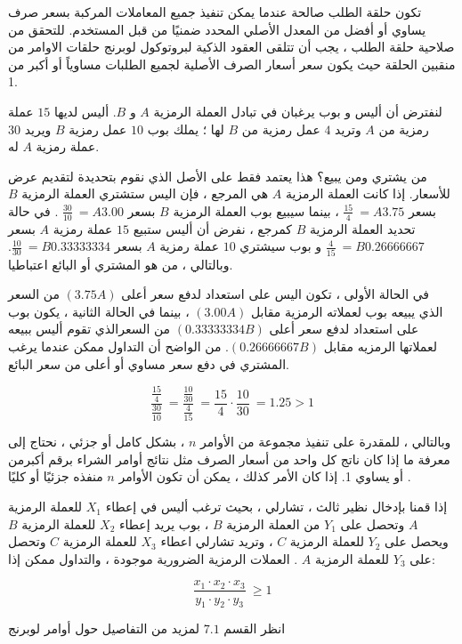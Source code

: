 \documentclass[12pt, a4paper, leqno]{report}
\theoremstyle{plain}
\theoremstyle{definition}
\begin{document}
\begin{multicols}{2}
\begin{otherlanguage}{arabic}
تكون حلقة الطلب صالحة عندما يمكن تنفيذ جميع المعاملات المركبة بسعر صرف يساوي أو أفضل من المعدل الأصلي المحدد ضمنيًا من قبل المستخدم. للتحقق من صلاحية حلقة الطلب ، يجب أن تتلقى العقود الذكية لبروتوكول لوبرنج حلقات الاوامر من منقبين الحلقة حيث يكون سعر أسعار الصرف الأصلية لجميع الطلبات مساوياً أو أكبر من 1.

لنفترض أن أليس و بوب يرغبان في تبادل العملة الرمزية $A$ و $B$.  أليس لديها $15$ عملة رمزية من $A$ وتريد $4$ عمل رمزية من $B$ لها ؛ يملك بوب $10$ عمل رمزية  $B$ ويريد $30$ عملة رمزية $A$ له.

من يشتري ومن يبيع؟ هذا يعتمد فقط على الأصل الذي نقوم بتحديدة لتقديم عرض للأسعار. إذا كانت العملة  الرمزية $A$ هي المرجع ، فإن اليس ستشتري العملة الرمزية $B$ بسعر $\frac{15}{4} \  = A3.75$ ، بينما سيبيع بوب العملة الرمزية  $B$ بسعر $\frac{30}{10} \  = A3.00$ . في حالة تحديد العملة الرمزية $B$ كمرجع ، نفرض أن أليس ستبيع $15$ عملة رمزية $A$ بسعر $\frac{4}{15} \  = B0.26666667$  و بوب سيشتري $10$ عملة  رمزية $A$ بسعر $\frac{10}{30} \  = B0.33333334$. وبالتالي ، من هو المشتري أو البائع اعتباطيا.

في الحالة الأولى ، تكون اليس على استعداد لدفع سعر أعلى $(3.75 A)$ من السعر الذي يبيعه بوب لعملاته الرمزية مقابل $(3.00 A)$ ، بينما في الحالة الثانية ، يكون بوب على استعداد لدفع سعر أعلى $(0.33333334 B)$ من السعرالذي تقوم أليس ببيعه لعملاتها الرمزيه مقابل $(0.26666667 B)$. من الواضح أن التداول ممكن عندما يرغب المشتري في دفع سعر مساوي أو أعلى من سعر البائع.

\begin{equation}
\label{1stequation}
\frac{\frac{15}{4}}{\frac{30}{10}} \ 
= \frac{\frac{10}{30}}{\frac{4}{15}} \ 
= \frac{15}{4} \cdot \frac{10}{30} \ 
= 1.25 > 1
\end{equation}

وبالتالي ، للمقدرة على تنفيذ مجموعة من الأوامر $n$ ، بشكل كامل أو جزئي ، نحتاج إلى معرفة ما إذا كان ناتج كل واحد من أسعار الصرف مثل نتائج أوامر الشراء برقم أكبرمن أو يساوي 1. إذا كان الأمر كذلك ، يمكن أن تكون الأوامر $n$ منفذه جزئيًا أو كليًا .

إذا قمنا بإدخال نظير ثالث ، تشارلي ، بحيث ترغب أليس في إعطاء $X_1$ للعملة الرمزية $A$ وتحصل على $Y_1$  من العملة الرمزية $B$ ، بوب يريد إعطاء $X_2$  للعملة الرمزية $B$ ويحصل على $Y_2$ للعملة الرمزية $C$ ، وتريد تشارلي اعطاء $X_3$  للعملة الرمزية $C$ وتحصل على $Y_3$ للعملة الرمزية $A$ . العملات الرمزية الضرورية موجودة ، والتداول ممكن إذا:

\begin{equation}
\label{1stequation}
\frac{{x_1} \cdot {x_2} \cdot {x_3}}
{{y_1} \cdot {y_2} \cdot {y_3}} \
\geq 1
\end{equation}

انظر القسم $7.1$ لمزيد من التفاصيل حول أوامر لوبرنج
\end{otherlanguage}
\end{multicols}
\end{document}
